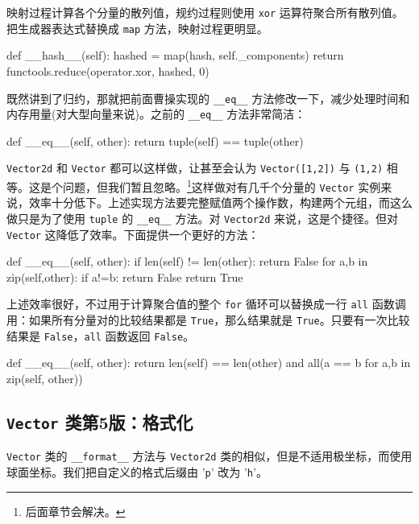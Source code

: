 映射过程计算各个分量的散列值，规约过程则使用 \texttt{xor} 运算符聚合所有散列值。把生成器表达式替换成 \texttt{map} 方法，映射过程更明显。

\begin{python}
def __hash__(self):
    hashed = map(hash, self._components)
    return functools.reduce(operator.xor, hashed, 0)
\end{python}

既然讲到了归约，那就把前面曹操实现的 \texttt{\_\_eq\_\_} 方法修改一下，减少处理时间和内存用量(对大型向量来说)。之前的 \texttt{\_\_eq\_\_} 方法非常简洁：

\begin{python}
def __eq__(self, other):
    return tuple(self) == tuple(other)
\end{python}

\texttt{Vector2d} 和 \texttt{Vector} 都可以这样做，让甚至会认为 \texttt{Vector([1,2])} 与 \texttt{(1,2)} 相等。这是个问题，但我们暂且忽略。\footnote{后面章节会解决。}这样做对有几千个分量的 \texttt{Vector} 实例来说，效率十分低下。上述实现方法要完整赋值两个操作数，构建两个元组，而这么做只是为了使用 \texttt{tuple} 的 \texttt{\_\_eq\_\_} 方法。对 \texttt{Vector2d} 来说，这是个捷径。但对 \texttt{Vector} 这降低了效率。下面提供一个更好的方法：

\begin{python}
def __eq__(self, other):
    if len(self) != len(other):
        return False
    for a,b in zip(self,other):
        if a!=b:
            return False
    return True
\end{python}

上述效率很好，不过用于计算聚合值的整个 \texttt{for} 循环可以替换成一行 \texttt{all} 函数调用：如果所有分量对的比较结果都是 \texttt{True}，那么结果就是 \texttt{True}。只要有一次比较结果是 \texttt{False}，\texttt{all} 函数返回 \texttt{False}。

\begin{python}
def __eq__(self, other):
    return len(self) == len(other) and all(a == b for a,b in zip(self, other))
\end{python}

\subsection{\texttt{Vector} 类第5版：格式化}

\texttt{Vector} 类的 \texttt{\_\_format\_\_} 方法与 \texttt{Vector2d} 类的相似，但是不适用极坐标，而使用球面坐标。我们把自定义的格式后缀由 '\texttt{p}' 改为 '\texttt{h}'。

